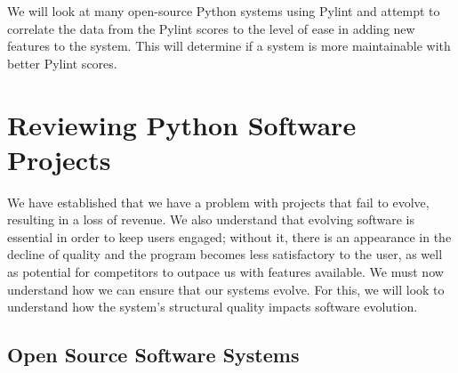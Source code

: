 \documentclass[12pt,conference]{IEEEtran}
\newcommand\todo[1]{\textcolor{red}{#1}}
\begin{document}
We will look at many open-source Python systems using Pylint and attempt to correlate the data from the Pylint scores to the level of ease in adding new features to the system. This will determine if a system is more maintainable with better Pylint scores. 


\vspace{0.5cm}
\section{Reviewing Python Software Projects}
\vspace{0.25cm}


We have established that we have a problem with projects that fail to evolve, resulting in a loss of revenue. We also understand that evolving software is essential in order to keep users engaged; without it, there is an appearance in the decline of quality and the program becomes less satisfactory to the user, as well as potential for competitors to outpace us with features available. We must now understand how we can ensure that our systems evolve. For this, we will look to understand how the system's structural quality impacts software evolution.

\vspace{0.25cm}
\subsection{Open Source Software Systems} \label{sectionSoftwareData}
\end{document}
